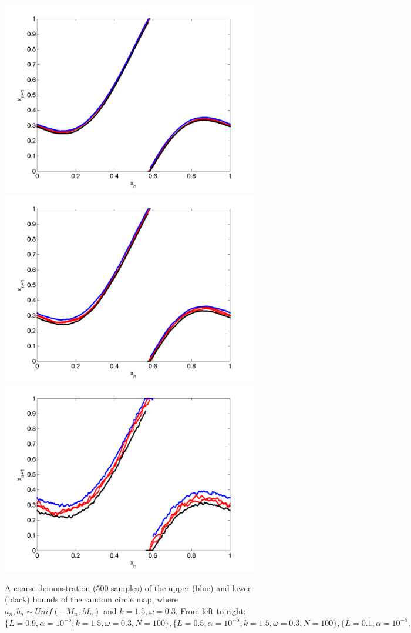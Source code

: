 \begin{figure}[htp]
\caption[Upper and lower bounds on the random circle map, with a uniform
distribution, where $k=1.5,\omega=0.3$]{A coarse
  demonstration (500 samples) of the upper (blue) and lower (black)
  bounds of the random circle map, where $a_n,b_n\sim Unif(-M_n,M_n)$
  and $k=1.5,\omega=0.3$. From left to right:
  $\{L=0.9,\alpha = 10^{-5},k=1.5,\omega=0.3,N=100\}, \{L=0.5,\alpha = 10^{-5},k=1.5,\omega=0.3,N=100\},\{L=0.1,\alpha = 10^{-5},k=1.5,\omega=0.3,N=100\},$
  }\label{fig:circ_u_envelope2}
\centering
\includegraphics[width=.3\textwidth]{figs/envelope_unif_500_k15_L09_w03.png}\hfill
\includegraphics[width=.3\textwidth]{figs/envelope_unif_500_k15_L05_w03.png}\hfill
\includegraphics[width=.3\textwidth]{figs/envelope_unif_500_k15_L01_w03.png}
\end{figure}
